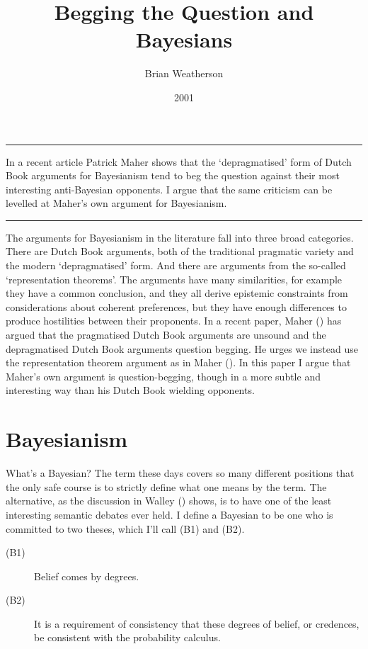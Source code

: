 \documentclass[
  10pt,
  letterpaper,
  DIV=11,
  numbers=noendperiod,
  twoside]{scrartcl}
\title{Begging the Question and Bayesians}
\author{Brian Weatherson}
\date{2001}
\renewenvironment{abstract}
 {\vspace{-1.25cm}
 \quotation\small\noindent\rule{\linewidth}{.5pt}\par\smallskip
 \noindent }
 {\par\noindent\rule{\linewidth}{.5pt}\endquotation}
\begin{document}
\maketitle
\begin{abstract}
In a recent article Patrick Maher shows that the `depragmatised' form of
Dutch Book arguments for Bayesianism tend to beg the question against
their most interesting anti-Bayesian opponents. I argue that the same
criticism can be levelled at Maher's own argument for Bayesianism.
\end{abstract}

The arguments for Bayesianism in the literature fall into three broad
categories. There are Dutch Book arguments, both of the traditional
pragmatic variety and the modern `depragmatised' form. And there are
arguments from the so-called `representation theorems'. The arguments
have many similarities, for example they have a common conclusion, and
they all derive epistemic constraints from considerations about coherent
preferences, but they have enough differences to produce hostilities
between their proponents. In a recent paper, Maher
() has argued that the pragmatised Dutch
Book arguments are unsound and the depragmatised Dutch Book arguments
question begging. He urges we instead use the representation theorem
argument as in Maher (). In this paper I
argue that Maher's own argument is question-begging, though in a more
subtle and interesting way than his Dutch Book wielding opponents.

\section{Bayesianism}\label{bayesianism}

What's a Bayesian? The term these days covers so many different
positions that the only safe course is to strictly define what one means
by the term. The alternative, as the discussion in Walley
() shows, is to have one of the least
interesting semantic debates ever held. I define a Bayesian to be one
who is committed to two theses, which I'll call (B1) and (B2).

\begin{description}
\item[(B1)]
Belief comes by degrees.
\item[(B2)]
It is a requirement of consistency that these degrees of belief, or
credences, be consistent with the probability calculus.
\end{description}
\end{document}
